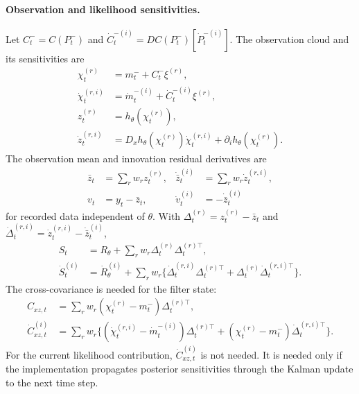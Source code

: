 \paragraph{Observation and likelihood sensitivities.}
Let \(C_t^-=C(P_t^-)\) and
\(\dot C_t^{-(i)}=DC(P_t^-)[\dot P_t^{-(i)}]\).  The observation cloud and its
sensitivities are
\begin{align}
  \chi_t^{(r)}&=m_t^-+C_t^-\xi^{(r)},\\
  \dot\chi_t^{(r,i)}
  &=
  \dot m_t^{-(i)}+\dot C_t^{-(i)}\xi^{(r)},\\
  z_t^{(r)}&=h_\theta(\chi_t^{(r)}),\\
  \dot z_t^{(r,i)}
  &=
  D_xh_\theta(\chi_t^{(r)})\dot\chi_t^{(r,i)}
  +\partial_i h_\theta(\chi_t^{(r)}).
  \label{eq:bf-hd-fsgq-obs-point-score}
\end{align}
The observation mean and innovation residual derivatives are
\begin{align}
  \bar z_t&=\sum_rw_rz_t^{(r)},&
  \dot{\bar z}_t^{(i)}&=\sum_rw_r\dot z_t^{(r,i)},\\
  v_t&=y_t-\bar z_t,&
  \dot v_t^{(i)}&=-\dot{\bar z}_t^{(i)}
  \label{eq:bf-hd-fsgq-z-v-score}
\end{align}
for recorded data independent of \(\theta\).  With
\(\Delta_t^{(r)}=z_t^{(r)}-\bar z_t\) and
\(\dot\Delta_t^{(r,i)}=\dot z_t^{(r,i)}-\dot{\bar z}_t^{(i)}\),
\begin{align}
  S_t&=R_\theta+\sum_rw_r\Delta_t^{(r)}\Delta_t^{(r)\top},\\
  \dot S_t^{(i)}
  &=
  \dot R_\theta^{(i)}
  +
  \sum_rw_r
  \{\dot\Delta_t^{(r,i)}\Delta_t^{(r)\top}
  +\Delta_t^{(r)}\dot\Delta_t^{(r,i)\top}\}.
  \label{eq:bf-hd-fsgq-S-score}
\end{align}
The cross-covariance is needed for the filter state:
\begin{align}
  C_{xz,t}&=\sum_rw_r
  (\chi_t^{(r)}-m_t^-)\Delta_t^{(r)\top},\\
  \dot C_{xz,t}^{(i)}
  &=
  \sum_rw_r
  \{(\dot\chi_t^{(r,i)}-\dot m_t^{-(i)})\Delta_t^{(r)\top}
  +(\chi_t^{(r)}-m_t^-)\dot\Delta_t^{(r,i)\top}\}.
  \label{eq:bf-hd-fsgq-cross-score}
\end{align}
For the current likelihood contribution, \(\dot C_{xz,t}^{(i)}\) is not needed.
It is needed only if the implementation propagates posterior sensitivities
through the Kalman update to the next time step.


